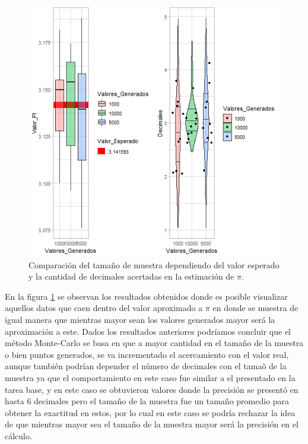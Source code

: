 \documentclass{article}
\begin{document}
\begin{figure}[H]
\begin{center}
\includegraphics[width=13cm]{exactpi.png}
\end{center}
\caption{ Comparaci\'on del tama\~no de muestra dependiendo del valor esperado y la cantidad de decimales acertadas en la
estimaci\'on de $\pi$. }
\label{f2}
\end{figure}

En la figura \ref{f2} se observan los resultados obtenidos donde es posible visualizar aquellos datos que caen dentro del valor aproximado a $\pi$  en donde se muestra de igual manera que mientras mayor sean los valores generados mayor ser\'a la aproximaci\'on a este. Dados los resultados anteriores podr\'iamos concluir que el m\'etodo Monte-Carlo se basa en que a mayor cantidad en el tama\~no de la muestra o bien puntos generados, se va incrementado el acercamiento con el valor real, aunque tambi\'en podr\'ian depender el n\'umero de decimales con el tama\~o de la muestra ya que el comportamiento en este caso fue similar a el presentado en la tarea base, y en este caso se obtuvieron valores donde la precisi\'on se present\'o en hasta 6 decimales pero el tama\~no de la muestra fue un tama\~no promedio para obtener la exactitud en estos, por lo cual en este caso se podr\'ia rechazar la idea de que mientras mayor sea el tama\~no de la muestra mayor ser\'a la precisi\'on en el c\'alculo.

  
  
\end{document}
